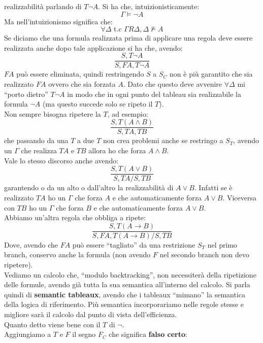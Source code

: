 \documentclass[a4paper,12pt, oneside]{book}
\begin{document}
realizzabilità parlando di $T\neg A$. Si ha che, intuizionisticamente:
\[\Gamma\vDash \neg A\]
Ma nell'intuizionismo significa che:
\[\forall\Delta \mbox{ t.c }\Gamma R \Delta, \Delta\nvDash A\]
Se diciamo che una formula realizzata prima di applicare una regola deve essere
realizzata anche dopo tale applicazione si ha che, avendo:
\[\frac{S, T\neg A}{S, FA, T\neg A}\]
$FA$ può essere eliminata, quindi restringendo $S$ a $S_C$ non è più garantito
che sia realizzato $FA$ ovvero che sia forzata $A$. Dato che questo deve
avvenire $\forall\Delta$ mi ``porto dietro'' $T\neg A$ in modo che in ogni punto
del tableau sia realizzabile la formula $\neg A$ (ma questo succede solo se
ripeto il $T$).\\
Non sempre bisogna ripetere la $T$, ad esempio:
\[\frac{S, T(A\land B)}{S, TA, TB}\]
che passando da una $T$ a due $T$ non crea problemi anche se restringo a
$S_T$, avendo un $\Gamma$ che realizza $TA$ e $TB$ allora ho che forza $A\land
B$.\\
Vale lo stesso discorso anche avendo:    
\[\frac{S, T(A\lor B)}{S, TA/S, TB}\]
garantendo o da un alto o dall'altro la realizzabilità di $A\lor B$. Infatti se
è 
realizzato $TA$ ho un $\Gamma$ che forza $A$ e che automaticamente forza $A\lor
B$. Viceversa con $TB$ ho un $\Gamma$ che forza $B$ e che automaticamente forza
$A\lor B$.\\
Abbiamo un'altra regola che obbliga a ripete:
\[\frac{S, T(A\to B)}{S, FA, T(A\to B)/S, TB}\]
Dove, avendo che $FA$ può essere ``tagliato'' da una restrizione $S_T$ nel primo
branch, conservo anche la formula (non avendo $F$ nel secondo branch non devo
ripetere). \\
Vediamo un calcolo che, ``modulo backtracking'', non necessiterà della
ripetizione delle formule, avendo già tutta la sua semantica all'interno del
calcolo. Si parla quindi di \textbf{semantic tableaux}, avendo che i tableaux
``mimano'' la semantica della logica di riferimento. Più semantica
incorporariamo nelle regole stesse e migliore sarà il calcolo dal punto di vista
dell'efficienza.\\
Quanto detto viene bene con il $T$ di $\neg$.\\
Aggiungiamo a $T$ e $F$ il segno $F_C$ che significa \textbf{falso certo}:
\end{document}
